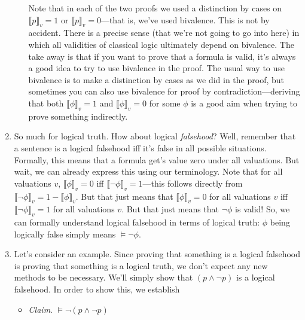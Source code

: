 \begin{enumerate}[\thesection.1]
\begin{enumerate}[(i)]
		Note that in each of the two proofs we used a distinction by cases on $\llbracket p\rrbracket_v=1$ or $\llbracket p\rrbracket_v=0$---that is, we've used bivalence. This is not by accident. There is a precise sense (that we're not going to go into here) in which all validities of classical logic ultimately depend on bivalence. The take away is that if you want to prove that a formula is valid, it's always a good idea to try to use bivalence in the proof. The usual way to use bivalence is to make a distinction by cases as we did in the proof, but sometimes you can also use bivalence for proof by contradiction---deriving that both $\llbracket \phi\rrbracket_v=1$ and $\llbracket \phi\rrbracket_v=0$ for some $\phi$ is a good aim when trying to prove something indirectly.
		
		\end{enumerate}
		
		\item So much for logical truth. How about logical \emph{falsehood}? Well, remember that a sentence is a logical falsehood iff it's false in all possible situations. Formally, this means that a formula get's value zero under all valuations. But wait, we can already express this using our terminology. Note that for all valuations $v$, $\llbracket\phi\rrbracket_v=0$ iff $\llbracket \neg\phi\rrbracket_v=1$---this follows directly from $\llbracket \neg\phi\rrbracket_v=1-\llbracket \phi\rrbracket_v$. But that just means that $\llbracket\phi\rrbracket_v=0$ for all valuations $v$ iff $\llbracket\neg \phi\rrbracket_v=1$ for all valuations $v$. But that just means that $\neg\phi$ is valid! So, we can formally understand logical falsehood in terms of logical truth: $\phi$ being logically false simply means $\vDash\neg\phi$. 
		
		\item Let's consider an example. Since proving that something is a logical falsehood is proving that something is a logical truth, we don't expect any new methods to be necessary. We'll simply show that $(p\land\neg p)$ is a logical falsehood. In order to show this, we establish
		
		\begin{itemize}
		
			\item \emph{Claim}. $\vDash\neg (p\land\neg p)$
			

\end{itemize}
\end{enumerate}
